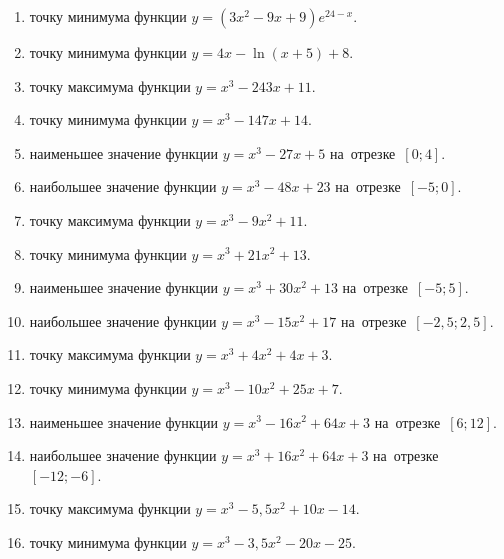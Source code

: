 \documentclass[a4paper,10pt]{article}
\begin{document}
\begin{enumerate}
\item {} точку минимума функции $y=\left(3x^2-9x+9\right){{e}^{24-x}}$.

\item {} точку минимума функции $y=4x-\ln \left(x+5\right)+8$.

\item {} точку максимума функции $y=x^3 -243x +11$.

\item {} точку минимума функции $y=x^3 -147x+14$.

\item {} наименьшее значение функции $y=x^3 -27x+5$ на~отрезке~$\left[0;4\right]$.

\item {} наибольшее значение функции $y=x^3 -48x+23$ на~отрезке~$\left[-5;0\right]$.

\item {} точку максимума функции $y=x^3 -9x^2+11$.

\item {} точку минимума функции $y=x^3 +21x^2+13$.

\item {} наименьшее значение функции $y=x^3 +30x^2+13$ на~отрезке~$\left[-5;5\right]$.

\item {} наибольшее значение функции $y=x^3 -15x^2+17$ на~отрезке~$\left[-2,5;2,5\right]$.

\item {} точку максимума функции $y=x^3 +4x^2+4x+3$.

\item {} точку минимума функции $y=x^3 -10x^2+25x+7$.

\item {} наименьшее значение функции $y=x^3 -16x^2+64x+3$ на~отрезке~$\left[6;12\right]$.

\item {} наибольшее значение функции $y=x^3 +16x^2+64x+3$ на~отрезке~$\left[-12;-6\right]$.

\item {} точку максимума функции $y=x^3 -5,5x^2+10x-14$.

\item {} точку минимума функции $y=x^3 -3,5x^2-20x-25$.


\end{enumerate}
\end{document}
